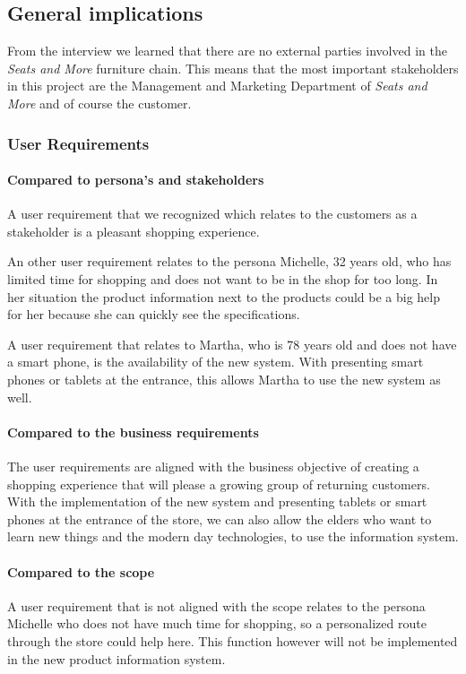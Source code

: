 \documentclass[a4paper]{article}
\begin{document}
\subsection{General implications}
From the interview we learned that there are no external parties involved in the \textit{Seats and More} furniture chain. This means that the most important stakeholders in this project are the Management and Marketing Department of \textit{Seats and More} and of course the customer.

\subsubsection*{User Requirements}

\paragraph*{Compared to persona's and stakeholders}
A user requirement that we recognized which relates to the customers as a stakeholder is a pleasant shopping experience. 

An other user requirement relates to the persona Michelle, 32 years old, who has limited time for shopping and does not want to be in the shop for too long. In her situation the product information next to the products could be a big help for her because she can quickly see the specifications. 

A user requirement that relates to Martha, who is 78 years old and does not have a smart phone, is the availability of the new system. With presenting smart phones or tablets at the entrance, this allows Martha to use the new system as well.

\paragraph{Compared to the business requirements}
The user requirements are aligned with the business objective of creating a shopping experience that will please a growing group of returning customers. With the implementation of the new system and presenting tablets or smart phones at the entrance of the store, we can also allow the elders who want to learn new things and the modern day technologies, to use the information system.

\paragraph{Compared to the scope}
A user requirement that is not aligned with the scope relates to the persona Michelle who does not have much time for shopping, so a personalized route through the store could help here. This function however will not be implemented in the new product information system.
\end{document}
